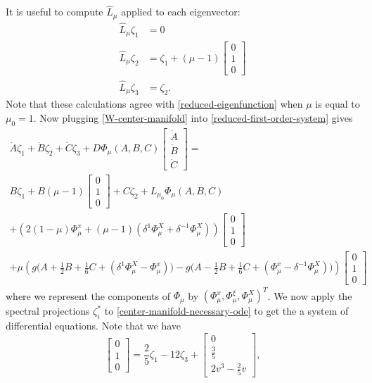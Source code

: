It is useful to compute \(\widehat L_\mu\) applied to each eigenvector:
\begin{align}
	\widehat L_\mu \zeta_1 &= 0 \\
	\widehat L_\mu \zeta_2 &= \zeta _1  + (\mu-1)\begin{bmatrix}0 \\ 1 \\ 0 \end{bmatrix} \\
	\widehat L_\mu \zeta_3 &= \zeta_2.
\end{align}
Note that these calculations agree with \cref{reduced-eigenfunction} when \(\mu\) is equal to \(\mu_0 = 1\). Now plugging \cref{W-center-manifold} into \cref{reduced-first-order-system} gives
\begin{multline}\label{center-manifold-necessary-ode}
	\dot A \zeta_1 + \dot B \zeta_2 + \dot C \zeta_3 + D\Phi_\mu(A,B,C) \begin{bmatrix} \dot A \\ \dot B \\ \dot C \end{bmatrix} = \\
	B \zeta_1 + B(\mu-1) \begin{bmatrix}0 \\ 1 \\ 0 \end{bmatrix} + C \zeta_2 + L_{\mu_0} \Phi_\mu(A,B,C) \\
	+ \left(2(1-\mu) \Phi_\mu^x + (\mu-1)(\delta^1 \Phi_\mu^X + \delta^{-1} \Phi_\mu^X)\right) \begin{bmatrix}0 \\ 1 \\ 0 \end{bmatrix} \\
	+ \mu\left( g\big(A + \frac 1 2 B + \frac 1 6 C + (\delta^1 \Phi_\mu^X -\Phi_\mu^x)\big) - g\big(A - \frac 1 2 B + \frac 1 6 C + (\Phi_\mu^x - \delta^{-1} \Phi_\mu^X)\big) \right) \begin{bmatrix}0 \\ 1 \\ 0 \end{bmatrix}
\end{multline}
where we represent the components of \(\Phi_\mu\) by \((\Phi_\mu^x, \Phi_\mu^\xi, \Phi_\mu^X)^T\). We now apply the spectral projections \(\zeta_i^*\) to \cref{center-manifold-necessary-ode} to get the a system of differential equations. Note that we have 
\begin{equation}
	\begin{bmatrix}
		0 \\ 1 \\ 0 
	\end{bmatrix} = \frac 25 \zeta_1 - 12 \zeta_3 + \begin{bmatrix}
	0 \\ \frac 3 5 \\ 2v^3 - \frac 2 5 v
\end{bmatrix},
\end{equation}
